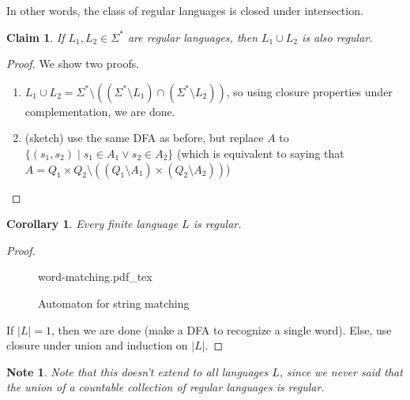 \documentclass[a4paper]{article}
\newtheorem{claim}{Claim}
\newtheorem{cor}{Corollary}
\newtheorem{note}{Note}
\newcommand{\incfig}[1]{%
    \def\svgwidth{0.9\columnwidth}
    {#1.pdf_tex}
}
\begin{document}
In other words, the class of regular languages is closed under intersection.

\begin{claim}
If $L_1, L_2 \in \Sigma^*$ are regular languages, then $L_1 \cup L_2$ is also regular. 
\end{claim}

\begin{proof}
    We show two proofs.
    \begin{enumerate}
        \item $L_1 \cup L_2 = \Sigma^* \setminus ((\Sigma^* \setminus L_1) \cap (\Sigma^* \setminus L_2))$, so using closure properties under complementation, we are done.
        \item (sketch) use the same DFA as before, but replace $A$ to $\{(s_1, s_2) \mid s_1 \in A_1 \lor s_2 \in A_2\}$ (which is equivalent to saying that $A = Q_1 \times Q_2 \setminus ((Q_1
            \setminus A_1)
            \times (Q_2 \setminus A_2))$)
    \end{enumerate}
\end{proof}

\begin{cor}
    Every finite language $L$ is regular.
\end{cor}
\begin{proof}
\begin{figure}[h]
    \centering
    \incfig{word-matching}
    \caption{Automaton for string matching}
    \label{fig:word-matching}
\end{figure}
    If $|L| = 1$, then we are done (make a DFA to recognize a single word).
    Else, use closure under union and induction on $|L|$.
\end{proof}
\begin{note}
    Note that this doesn't extend to all languages $L$, since we never said that the union of a countable collection of regular languages is regular.
\end{note}
\end{document}
